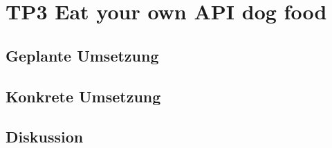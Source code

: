 \section{TP3 Eat your own API dog food}
\label{sec:principle-tp3-eat-your-own-api}

\subsection*{Geplante Umsetzung}


\subsection*{Konkrete Umsetzung}


\subsection*{Diskussion}
